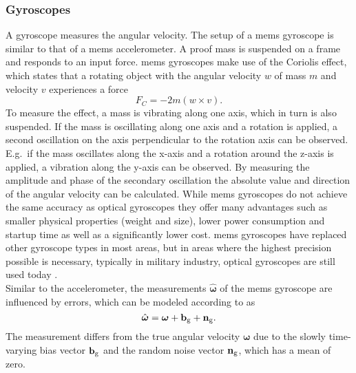 \subsubsection{ Gyroscopes}
A gyroscope measures the angular velocity.
The setup of a \gls{mems} gyroscope is similar to that of a \gls{mems} accelerometer.
A proof mass is suspended on a frame and responds to an input force.
\gls{mems} gyroscopes make use of the Coriolis effect, which states that a rotating object with the angular velocity $w$ of mass $m$ and velocity $v$ experiences a force
\begin{equation}
	F_C = -2m(w\times v).
\end{equation}
To measure the effect, a mass is vibrating along one axis, which in turn is also suspended.
If the mass is oscillating along one axis and a rotation is applied, a second oscillation on the axis perpendicular to the rotation axis can be observed.
E.g.\ if the mass oscillates along the x-axis and a rotation around the z-axis is applied, a vibration along the y-axis can be observed.
By measuring the amplitude and phase of the secondary oscillation the absolute value and direction of the angular velocity can be calculated.
While \gls{mems} gyroscopes do not achieve the same accuracy as optical gyroscopes they offer many advantages such as smaller physical properties (weight and size), lower power consumption and startup time as well as a significantly lower cost.
\gls{mems} gyroscopes have replaced other gyroscope types in most areas, but in areas where the highest precision possible is necessary, typically in military industry, optical gyroscopes are still used today \cite{Perlmutter2016}.\\
Similar to the accelerometer, the measurements $\hat{\boldsymbol{\omega}}$ of the \gls{mems} gyroscope are influenced by errors, which can be modeled according to \cite{Lefferts1982} as
\begin{equation}
	\hat{\boldsymbol{\omega}} = \boldsymbol{\omega} + \vb{b}_\mathrm{g} + \vb{n}_\mathrm{g}.
\end{equation}
The measurement differs from the true angular velocity $\boldsymbol{\omega}$ due to the slowly time-varying bias vector $\vb{b}_\mathrm{g}$ and the random noise vector $\vb{n}_\mathrm{g}$, which has a mean of zero.

